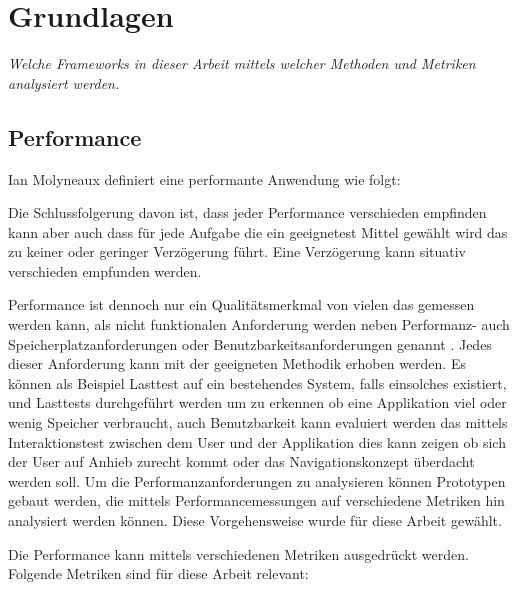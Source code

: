 \documentclass[main.tex]{subfiles}
\begin{document}
\chapter{Grundlagen}

\textit{Welche Frameworks in dieser Arbeit mittels welcher Methoden und Metriken analysiert werden.}




\section{Performance} 

Ian Molyneaux definiert eine performante Anwendung wie folgt:\newline
\noindent 
{}\cite{molyneaux2014art}

Die Schlussfolgerung davon ist, dass jeder Performance verschieden empfinden kann aber auch dass für jede Aufgabe die ein geeignetest Mittel gewählt wird das zu keiner oder geringer Verzögerung führt. Eine Verzögerung kann situativ verschieden empfunden werden.

Performance ist dennoch nur ein Qualitätsmerkmal von vielen das gemessen werden kann, als nicht funktionalen Anforderung werden neben Performanz- auch Speicherplatzanforderungen oder Benutzbarkeitsanforderungen genannt \cite[S. 120]{sommerville_2012}. Jedes dieser Anforderung kann mit der geeigneten Methodik erhoben werden. Es können als Beispiel Lasttest auf ein bestehendes System, falls einsolches existiert, und Lasttests durchgeführt werden um zu erkennen ob eine Applikation viel oder wenig Speicher verbraucht, auch Benutzbarkeit kann evaluiert werden das mittels Interaktionstest zwischen dem User und der Applikation dies kann zeigen ob sich der User auf Anhieb zurecht kommt oder das Navigationskonzept überdacht werden soll. Um die Performanzanforderungen zu analysieren können Prototypen gebaut werden, die mittels Performancemessungen auf verschiedene Metriken hin analysiert werden können. Diese Vorgehensweise wurde für diese Arbeit gewählt. 

Die Performance kann mittels verschiedenen Metriken ausgedrückt werden. Folgende Metriken sind für diese Arbeit relevant:
\end{document}
